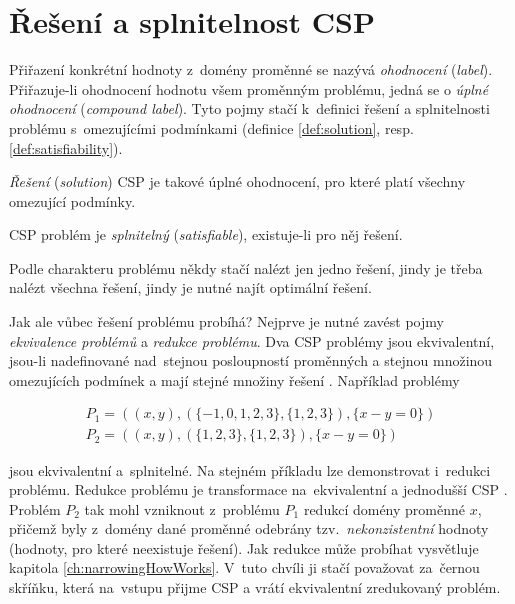 \section{Řešení a splnitelnost CSP}
Přiřazení konkrétní hodnoty z~domény proměnné se nazývá \emph{ohodnocení} (\emph{label}). Přiřazuje-li ohodnocení hodnotu všem proměnným problému, jedná se o \emph{úplné ohodnocení} (\emph{compound label}). Tyto pojmy stačí k~definici řešení a splnitelnosti problému s~omezujícími podmínkami (definice \ref{def:solution}, resp. \ref{def:satisfiability}).

\begin{definition}
\label{def:solution}
\emph{Řešení} (\emph{solution}) CSP je takové úplné ohodnocení, pro které platí všechny omezující podmínky.
\end{definition}

\begin{definition}
\label{def:satisfiability}
CSP problém je \emph{splnitelný} (\emph{satisfiable}), existuje-li pro něj řešení.
\end{definition}

Podle charakteru problému někdy stačí nalézt jen jedno řešení, jindy je třeba nalézt všechna řešení, jindy je nutné najít optimální řešení.

Jak ale vůbec řešení problému probíhá? Nejprve je nutné zavést pojmy \emph{ekvivalence problémů} a \emph{redukce problému}. Dva CSP problémy jsou ekvivalentní, jsou-li nadefinované nad~stejnou posloupností proměnných a stejnou množinou omezujících podmínek a mají stejné množiny řešení \cite[s.~18]{Vu2005}. Například problémy

\begin{align*}
P_1 = ((x, y), (\{-1,0,1,2,3\}, \{1,2,3\}), \{x - y = 0\}) \\
P_2 = ((x, y), (\{1,2,3\}, \{1,2,3\}), \{x - y = 0\})
\end{align*}

jsou ekvivalentní a~splnitelné. Na stejném příkladu lze demonstrovat i~redukci problému. Redukce problému je transformace na~ekvivalentní a jednodušší CSP \cite[s.~23]{Vu2005}. Problém $P_2$ tak mohl vzniknout z~problému $P_1$ redukcí domény proměnné $x$, přičemž byly z~domény dané proměnné odebrány tzv.~\emph{nekonzistentní} hodnoty (hodnoty, pro které neexistuje řešení). Jak redukce může probíhat vysvětluje kapitola \ref{ch:narrowingHowWorks}. V~tuto chvíli ji stačí považovat za~černou skříňku, která na~vstupu přijme CSP a vrátí ekvivalentní zredukovaný problém.

